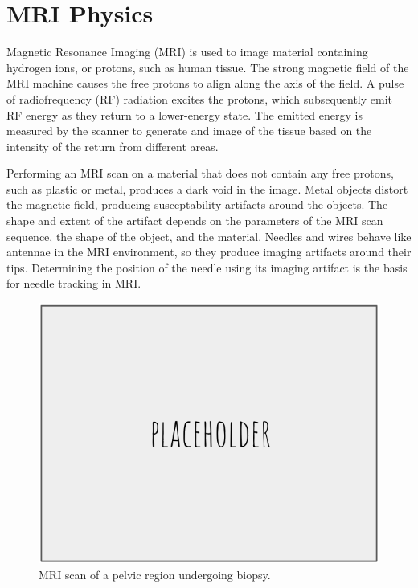 \section{MRI Physics}

Magnetic Resonance Imaging (MRI) is used to image material containing hydrogen ions, or protons, such as human tissue. The strong magnetic field of the MRI machine causes the free protons to align along the axis of the field. A pulse of radiofrequency (RF) radiation excites the protons, which subsequently emit RF energy as they return to a lower-energy state. The emitted energy is measured by the scanner to generate and image of the tissue based on the intensity of the return from different areas.

Performing an MRI scan on a material that does not contain any free protons, such as plastic or metal, produces a dark void in the image. Metal objects distort the magnetic field, producing susceptability artifacts around the objects. The shape and extent of the artifact depends on the parameters of the MRI scan sequence, the shape of the object, and the material. Needles and wires behave like antennae in the MRI environment, so they produce imaging artifacts around their tips\cite{lewin_needle_1996}. Determining the position of the needle using its imaging artifact is the basis for needle tracking in MRI\cite{song_biopsy_2012}.

\begin{figure}[h]
\includegraphics[width=1.0\textwidth]{Fig/placeholder.png}
\caption{MRI scan of a pelvic region undergoing biopsy.}
\label{fig:mri_human}
\end{figure}

